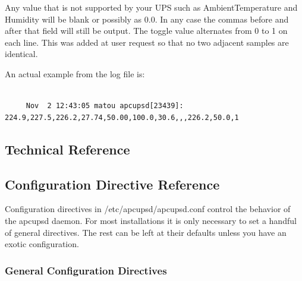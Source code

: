 {{{{{{{{{{Any value that is not supported by your UPS such as AmbientTemperature and
Humidity will be blank or possibly as 0.0. In any case the commas before and
after that field will still be output. The toggle value alternates from 0 to 1
on each line. This was added at user request so that no two adjacent samples
are identical.  

An actual example from the log file is: 

\footnotesize
\begin{verbatim}
     
     Nov  2 12:43:05 matou apcupsd[23439]: 224.9,227.5,226.2,27.74,50.00,100.0,30.6,,,226.2,50.0,1
\end{verbatim}
\normalsize

\label{Technical-Reference}

\subsection*{Technical Reference}

\label{index-Technical-Reference-235}

\label{Configuration-Directive-Reference}

\subsection*{Configuration Directive Reference}

\label{index-Reference_002c-Directives-236}
\label{index-Configuration_002c-Directives-237}
\label{index-Directives-238}
Configuration directives in /etc/apcupsd/apcupsd.conf control the behavior of
the apcupsd daemon.  For most installations it is only necessary to set a
handful of general directives. The rest can be left at their defaults unless
you have an exotic configuration. 

\label{General-Configuration-Directives}

\subsubsection*{General Configuration Directives}

}}}}}}}}}}
